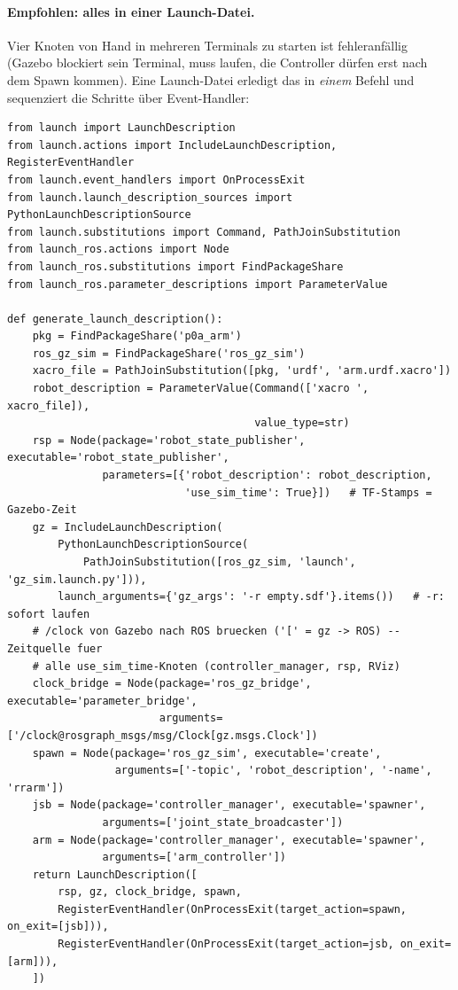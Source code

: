\paragraph{Empfohlen: alles in einer Launch-Datei.} Vier Knoten von Hand in
mehreren Terminals zu starten ist fehleranfällig (Gazebo blockiert sein Terminal,
 muss laufen, die Controller dürfen erst nach dem
Spawn kommen). Eine Launch-Datei erledigt das in \emph{einem} Befehl und
sequenziert die Schritte über Event-Handler:
\begin{lstlisting}[style=py,caption={\code{launch/gazebo.launch.py}}]
from launch import LaunchDescription
from launch.actions import IncludeLaunchDescription, RegisterEventHandler
from launch.event_handlers import OnProcessExit
from launch.launch_description_sources import PythonLaunchDescriptionSource
from launch.substitutions import Command, PathJoinSubstitution
from launch_ros.actions import Node
from launch_ros.substitutions import FindPackageShare
from launch_ros.parameter_descriptions import ParameterValue

def generate_launch_description():
    pkg = FindPackageShare('p0a_arm')
    ros_gz_sim = FindPackageShare('ros_gz_sim')
    xacro_file = PathJoinSubstitution([pkg, 'urdf', 'arm.urdf.xacro'])
    robot_description = ParameterValue(Command(['xacro ', xacro_file]),
                                       value_type=str)
    rsp = Node(package='robot_state_publisher', executable='robot_state_publisher',
               parameters=[{'robot_description': robot_description,
                            'use_sim_time': True}])   # TF-Stamps = Gazebo-Zeit
    gz = IncludeLaunchDescription(
        PythonLaunchDescriptionSource(
            PathJoinSubstitution([ros_gz_sim, 'launch', 'gz_sim.launch.py'])),
        launch_arguments={'gz_args': '-r empty.sdf'}.items())   # -r: sofort laufen
    # /clock von Gazebo nach ROS bruecken ('[' = gz -> ROS) -- Zeitquelle fuer
    # alle use_sim_time-Knoten (controller_manager, rsp, RViz)
    clock_bridge = Node(package='ros_gz_bridge', executable='parameter_bridge',
                        arguments=['/clock@rosgraph_msgs/msg/Clock[gz.msgs.Clock'])
    spawn = Node(package='ros_gz_sim', executable='create',
                 arguments=['-topic', 'robot_description', '-name', 'rrarm'])
    jsb = Node(package='controller_manager', executable='spawner',
               arguments=['joint_state_broadcaster'])
    arm = Node(package='controller_manager', executable='spawner',
               arguments=['arm_controller'])
    return LaunchDescription([
        rsp, gz, clock_bridge, spawn,
        RegisterEventHandler(OnProcessExit(target_action=spawn, on_exit=[jsb])),
        RegisterEventHandler(OnProcessExit(target_action=jsb, on_exit=[arm])),
    ])
\end{lstlisting}

